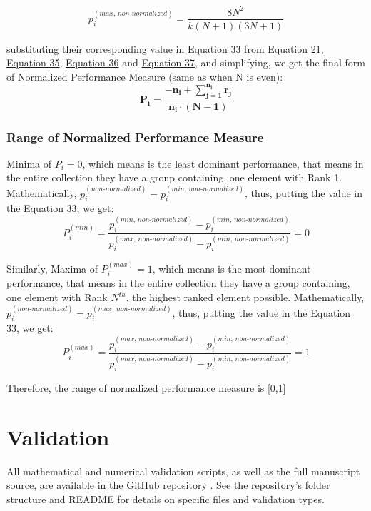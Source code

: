 \documentclass[man,floatsintext]{apa7}
\begin{document}
\begin{equation}
	\label{eq:maxima-odd}
	p_i^{(max, \, non\text{-}normalized)} = \frac{8N^2}{k (N+1)(3N+1)}
\end{equation}

substituting their corresponding value in \hyperref[eq:normalized-simpler]{Equation 33} from \hyperref[p-non-normalized]{Equation 21},  
\hyperref[eq:even-SUDH-odd]{Equation 35}, \hyperref[eq:minima-odd]{Equation 36} and \hyperref[eq:maxima-odd]{Equation 37}, and simplifying, we get the final form of Normalized Performance Measure (same as when N is even):
\begin{equation}
	\boxed{
		\mathbf{
			P_i = \frac{-n_i +  \sum\limits_{j=1}^{n_i} r_j}{n_i \cdot (N - 1)}}
	}
\end{equation}


\subsubsection{Range of Normalized Performance Measure}
Minima of $P_i = 0$, which means is the least dominant performance, that means in the entire collection they have a group containing, one element with Rank 1. Mathematically, $p_i^{(non\text{-}normalized)} =  p_i^{(min, \, non\text{-}normalized)}$, thus, putting the value in the \hyperref[eq:normalized-simpler]{Equation 33}, we get:
\begin{equation}
	P_i^{(min)} = \frac{p_i^{(min, \, non\text{-}normalized)} - p_i^{(min, \, non\text{-}normalized)}}{p_i^{(max, \, non\text{-}normalized)} - p_i^{(min, \, non\text{-}normalized)}} = 0
\end{equation}

Similarly,
Maxima of $P_i^{(max)} = 1$, which means is the most dominant performance, that means in the entire collection they have a group containing, one element with Rank $N^{th}$, the highest ranked element possible. Mathematically, $p_i^{(non\text{-}normalized)} =  p_i^{(max, \, non\text{-}normalized)}$, thus, putting the value in the \hyperref[eq:normalized-simpler]{Equation 33}, we get:
\begin{equation}
	P_i^{(max)} = \frac{p_i^{(max, \, non\text{-}normalized)} - p_i^{(min, \, non\text{-}normalized)}}{p_i^{(max, \, non\text{-}normalized)} - p_i^{(min, \, non\text{-}normalized)}} = 1
\end{equation}

Therefore, the range of normalized performance measure is [0,1]


\section{Validation}
All mathematical and numerical validation scripts, as well as the full manuscript source, are available in the GitHub repository \cite{silentkarmi2025normalized}. See the repository's folder structure and README for details on specific files and validation types.
\end{document}
